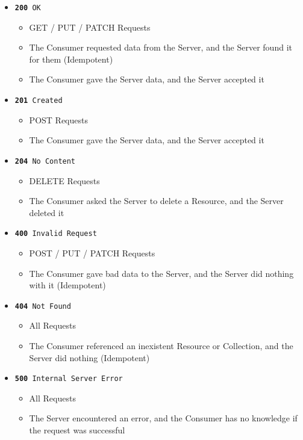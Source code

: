 \documentclass{book}
\begin{document}
\begin{itemize}
\item \texttt{\textbf{200} OK}
    \begin{itemize}
    \item GET / PUT / PATCH  Requests
    \item The Consumer requested data from the Server, and the Server found it for them (Idempotent)
    \item The Consumer gave the Server data, and the Server accepted it
    \end{itemize}
\item \texttt{\textbf{201} Created}
    \begin{itemize}
    \item POST Requests
    \item The Consumer gave the Server data, and the Server accepted it
    \end{itemize}
\item \texttt{\textbf{204} No Content}
    \begin{itemize}
    \item DELETE Requests
    \item The Consumer asked the Server to delete a Resource, and the Server deleted it
    \end{itemize}
\item \texttt{\textbf{400} Invalid Request}
    \begin{itemize}
    \item POST / PUT / PATCH Requests
    \item The Consumer gave bad data to the Server, and the Server did nothing with it (Idempotent)
    \end{itemize}
\item \texttt{\textbf{404} Not Found}
    \begin{itemize}
    \item All Requests
    \item The Consumer referenced an inexistent Resource or Collection, and the Server did nothing (Idempotent)
    \end{itemize}
\item \texttt{\textbf{500} Internal Server Error}
    \begin{itemize}
    \item All Requests
    \item The Server encountered an error, and the Consumer has no knowledge if the request was successful
    \end{itemize}
\end{itemize}
\end{document}
